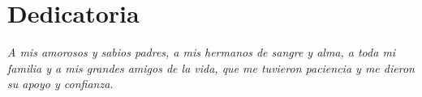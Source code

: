\clearpage
{}
{}

\chapter*{Dedicatoria}
\begin{flushright}
\vspace{3cm}	
	\textit{A mis amorosos y sabios padres, a mis hermanos de sangre y alma, a toda mi familia y a mis grandes amigos de la vida, que me tuvieron paciencia y me dieron su apoyo y confianza.}
\end{flushright}
